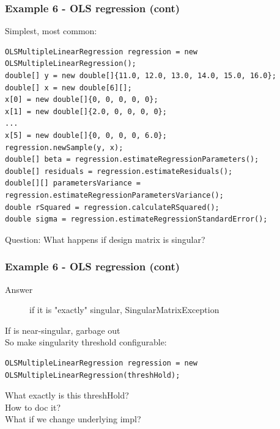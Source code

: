 \documentclass[14pt,mathserif]{beamer}
\begin{document}
\begin{frame}[fragile]
  \frametitle{Example 6 - OLS regression (cont)}

\begin{small}
Simplest, most common:
\begin{verbatim}
OLSMultipleLinearRegression regression = new OLSMultipleLinearRegression();
double[] y = new double[]{11.0, 12.0, 13.0, 14.0, 15.0, 16.0};
double[] x = new double[6][];
x[0] = new double[]{0, 0, 0, 0, 0};
x[1] = new double[]{2.0, 0, 0, 0, 0};
...
x[5] = new double[]{0, 0, 0, 0, 6.0};          
regression.newSample(y, x);
double[] beta = regression.estimateRegressionParameters();       
double[] residuals = regression.estimateResiduals();
double[][] parametersVariance = regression.estimateRegressionParametersVariance();
double rSquared = regression.calculateRSquared();
double sigma = regression.estimateRegressionStandardError();
\end{verbatim}
\end{small}
Question:  What happens if design matrix is singular?
\end{frame}

\begin{frame}[fragile]
  \frametitle{Example 6 - OLS regression (cont)}

\begin{small}
\begin{description}
  \item[Answer] if it is "exactly" singular, SingularMatrixException
\end{description}
If is near-singular, garbage out \\
So make singularity threshold configurable:
\begin{verbatim}
OLSMultipleLinearRegression regression = new OLSMultipleLinearRegression(threshHold);
\end{verbatim}
What exactly is this threshHold? \\
How to doc it? \\
What if we change underlying impl?
\end{small}
\end{frame}
\end{document}
